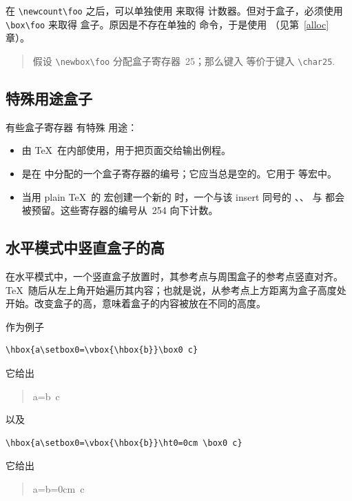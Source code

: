 \documentclass[a4paper]{rapport3}
\newenvironment{disp}{\begin{quotation}}{\end{quotation}}
\newenvironment{example}{\begin{quotation}}{\end{quotation}}
\begin{document}
在 \verb.\newcount\foo. 之后，可以单独使用  来取得  计数器。但对于盒子，必须使用 \verb.\box\foo. 来取得  盒子。原因是不存在单独的  命令，于是使用 （见第~\ref{alloc} 章）。

\begin{example}
假设 \verb.\newbox\foo. 分配盒子寄存器~25；那么键入  等价于键入
\verb.\char25..
\end{example}

\subsection{特殊用途盒子}

有些盒子寄存器
有特殊
用途：
\begin{itemize}
\item {} 由 \TeX\ 在内部使用，用于把页面交给输出例程。
\item {} 是在  中分配的一个盒子寄存器的编号；它应当总是空的。它用于  等宏中。
\item 当用 plain \TeX\ 的  宏创建一个新的  时，一个与该 insert 同号的 、、 与  都会被预留。这些寄存器的编号从~254 向下计数。
\end{itemize}


\subsection{水平模式中竖直盒子的高}

在水平模式中，一个竖直盒子放置时，其参考点与周围盒子的参考点竖直对齐。\TeX\ 随后从左上角开始遍历其内容；也就是说，从参考点上方距离为盒子高度处开始。改变盒子的高，意味着盒子的内容被放在不同的高度。

作为例子
\begin{verbatim}
\hbox{a\setbox0=\vbox{\hbox{b}}\box0 c}
\end{verbatim}
它给出
\begin{disp}\leavevmode\hbox{a=\vbox{\hbox{b}} c}\end{disp}
以及
\begin{verbatim}
\hbox{a\setbox0=\vbox{\hbox{b}}\ht0=0cm \box0 c}
\end{verbatim}
\awp
它给出
\begin{disp}\leavevmode\hbox{a=\vbox{\hbox{b}}=0cm  c}\end{disp}
\end{document}
